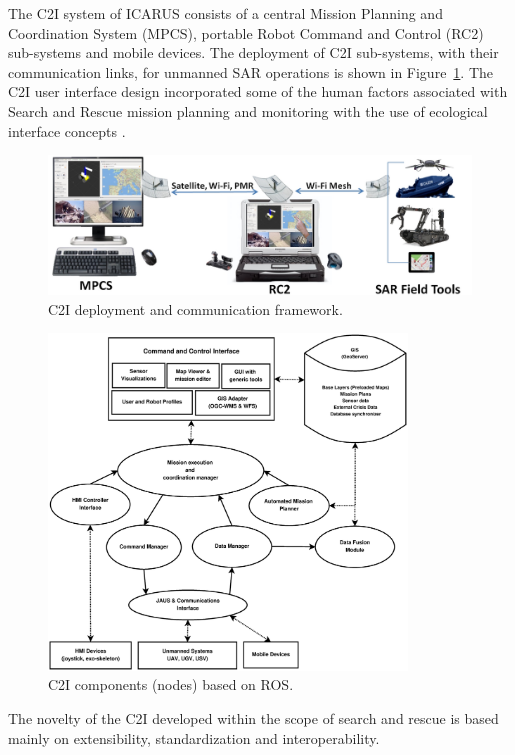 \documentclass{article}
\begin{document}
The C2I system of ICARUS consists of a central Mission Planning and Coordination System (MPCS), portable Robot Command and Control (RC2) sub-systems and mobile devices.
The deployment of C2I sub-systems, with their communication links, for unmanned SAR operations is shown in Figure~\ref{fig:c2i_sys_arch}.
The C2I user interface design incorporated some of the human factors associated with Search and Rescue mission planning and monitoring with the use of ecological interface concepts \cite{EcoIf}.
\begin{figure}
    \centering
    \includegraphics[width=\textwidth]{ROB-15-0035_fig4}
    \caption{C2I deployment and communication framework.}
    \label{fig:c2i_sys_arch}
\end{figure}
\begin{figure} [h]
    \centering
    \includegraphics[width=0.85\textwidth]{ROB-15-0035_fig5.eps}
    \caption{C2I components (nodes) based on ROS.}
    \label{fig:c2i_ros_arch}
\end{figure}
The novelty of the C2I developed within the scope of search and rescue is based mainly on extensibility, standardization and interoperability.
\end{document}
